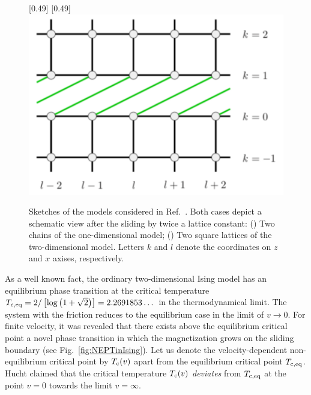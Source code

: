 \begin{figure}[htbp]
	\centering
	\subcaptionbox{\label{subcap:one-dim}}[0.49\linewidth]{}
	\subcaptionbox{\label{subcap:two-dim}}[0.49\linewidth]{\includegraphics[width=0.35\linewidth]{Fig3Modified.pdf}}
	\caption{Sketches of the models considered in Ref.~\cite{Hucht2009b}\protect\footnotemark. Both cases depict a schematic view after the sliding by twice a lattice constant: () Two chains of the one-dimensional model; () Two square lattices of the two-dimensional model. Letters $k$ and $l$ denote the coordinates on $z$ and $x$ axises, respectively.}
	\label{fig:SketchNEIsing}
\end{figure}


As a well known fact, the ordinary two-dimensional Ising model has an equilibrium phase transition at the critical temperature $T_{\rm c,eq}=2/\left[\log\left(1+\sqrt{2}\right)\right]=2.2691853\dots$ in the thermodynamical limit. The system with the friction reduces to the equilibrium case in the limit of $v\to 0$. For finite velocity, it was revealed \cite{Kadau2008,Hucht2009b} that there exists above the equilibrium critical point a novel phase transition in which the magnetization grows on the sliding boundary (see Fig.~\ref{fig:NEPTinIsing}). Let us denote the velocity-dependent non-equilibrium critical point by $T_{\rm c}(v)$ apart from the equilibrium critical point $T_{\rm c, eq}$. Hucht \cite{Hucht2009b} claimed that the critical temperature $T_{\rm c}(v)$ \textit{deviates} from $T_{\rm c,eq}$ at the point $v=0$ towards the limit $v=\infty$.

